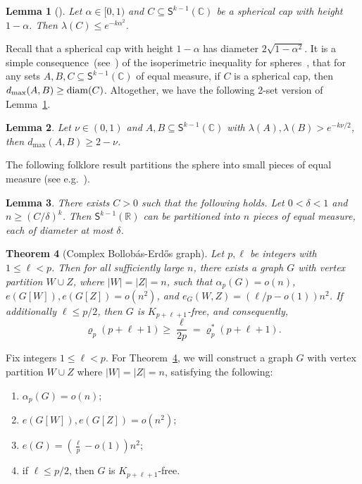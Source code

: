 \documentclass[10pt,a4paper]{article}
\newcounter{propcounter}
\newtheorem{theorem}{Theorem}[section]
\newtheorem{lemma}[theorem]{Lemma}
\theoremstyle{definition}
\def\al{{\alpha}}
\newcommand{\diam}[1]{{\rm{diam}}(#1)}
\newcommand{\sS}{\mathsf{S}}
\newcommand{\sC}{\mathbb{C}}
\newcommand{\sR}{\mathbb{R}}
\begin{document}
\begin{lemma}[\cite{Tkocz}]\label{lem:cap-UB}
	Let $\alpha\in [0,1)$ and $C\subseteq \sS^{k-1}(\sC)$ be a spherical cap with height $1-\alpha$. Then $\lambda(C)\le e^{-k\alpha^2}$.
\end{lemma}

Recall that a spherical cap with height $1-\alpha$ has diameter $2\sqrt{1-\alpha^2}$.
It is a simple consequence~(see~\cite{BL-1}) of the isoperimetric inequality for spheres~\cite{Schmidt}, that for any sets $A,B,C\subseteq \sS^{k-1}(\sC)$ of equal measure, if $C$ is a spherical cap, then $d_{\max}(A,B)\ge \diam{C}$. Altogether, we have the following 2-set version of Lemma~\ref{lem:cap-UB}.

\begin{lemma}\label{lem:cap-2set}
	Let $\nu\in (0,1)$ and $A,B\subseteq\sS^{k-1}(\sC)$ with $\lambda(A), \lambda(B)>e^{-k\nu/2}$, then $d_{\max}(A,B)\ge 2-\nu$.
\end{lemma}

The following folklore result partitions the sphere into small pieces of equal measure (see e.g.~\cite{FS}).
\begin{lemma}\label{lem: partition-sphere}
	There exists $C>0$ such that the following holds. Let $0<\delta<1$ and $n\ge (C/\delta)^k$. Then $\sS^{k-1}(\sR)$ can be partitioned into $n$ pieces of equal measure, each of diameter at most $\delta$.
\end{lemma}

\begin{theorem}[Complex Bollob\'as-Erd\H{o}s graph]\label{GBE}
	Let $p,\ell$ be integers with $1 \leq \ell <p $. Then for all sufficiently large $n$,  there exists a graph $G$ with vertex partition $W \cup Z$, where $|W|=|Z|=n$, such that $\alpha_p(G) =o(n)$, $e(G[W]), e(G[Z])=o(n^2)$, and $e_G(W,Z) = (\ell/p-o(1))n^2$. If additionally $\ell\le p/2$, then $G$ is $K_{p+\ell+1}$-free, and consequently,
	$$\varrho_p(p+\ell+1) \geq \frac{\ell}{2p} = \varrho_p^*(p+\ell+1).$$
\end{theorem}

Fix integers $1\le \ell <p$. For Theorem~\ref{GBE}, we will construct a graph $G$ with vertex partition $W \cup Z$ where $|W|=|Z|=n$, satisfying the following:
\begin{enumerate}[label = {\bfseries \Alph{propcounter}\arabic{enumi}}]
	\item\label{CBE:p-ind} $\al_{p}(G)= o(n)$;
	\item\label{CBE:sparse-inside} $e(G[W]),e(G[Z]) = o(n^2)$;
    \item\label{CBE:density} $e(G)= \left(\frac{\ell}{p}-o(1)\right)n^2$;
    \item\label{CBE:clique} if $\ell\le p/2$, then $G$ is $K_{p+\ell+1}$-free.
\end{enumerate}
\end{document}
